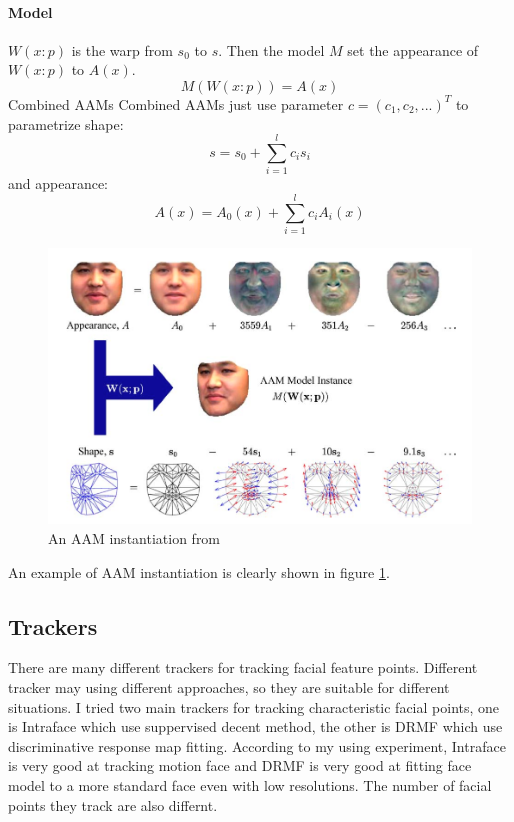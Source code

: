 \paragraph{Model} 
$W(x:p)$ is the warp from $s_{0}$ to $s$. Then the model $M$ set the appearance of $W(x:p)$ to $A(x)$.
\begin{equation}
M(W(x:p)) = A(x)
\end{equation}
\newline
Combined AAMs
\newline
Combined AAMs just use parameter $c = (c_{1},c_{2},...)^{T}$ to parametrize shape:
\begin{equation}
s = s_{0} + \sum_{i=1}^{l}c_{i}s_{i}
\end{equation}
and appearance:
\begin{equation}
A(x) = A_{0}(x) + \sum_{i=1}^{l}c_{i}A_{i}(x)
\end{equation}
\begin{figure}[ht]
\centering
\includegraphics[width = \textwidth]{imgs/AAM_Model.png}
\caption{An AAM instantiation from \cite{matthews2004active}}
\label{fig:AAMI}
\end{figure}
An example of AAM instantiation is clearly shown in figure \ref{fig:AAMI}.
\subsection{Trackers}
There are many different trackers for tracking facial feature points. Different tracker may using different approaches, so they are suitable for different situations. I tried two main trackers for tracking characteristic facial points, one is Intraface \cite{xiong2013supervised} which use suppervised decent method, the other is DRMF \cite{asthana2013robust} which use discriminative response map fitting. According to my using experiment, Intraface is very good at tracking motion face and DRMF is very good at fitting face model to a more standard face even with low resolutions. The number of facial points they track are also differnt.

